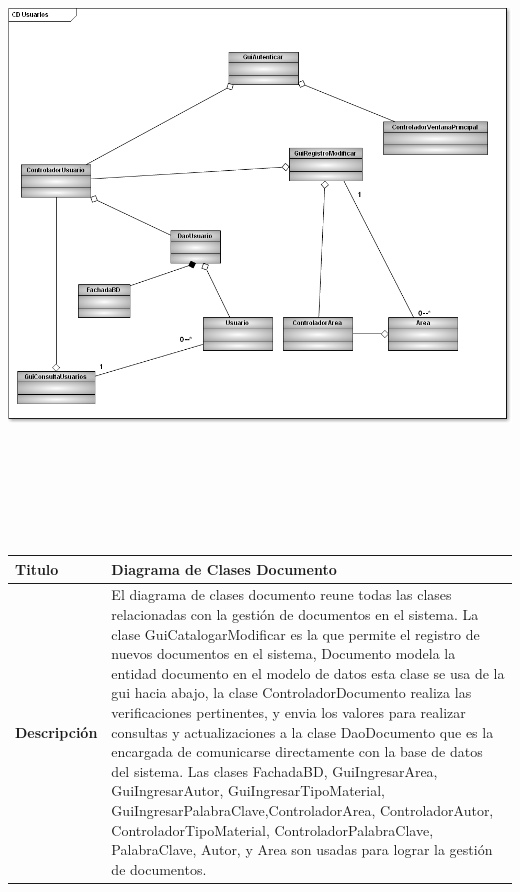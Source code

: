 	\begin{minipage}[c]{1\linewidth}
	\centering
	\includegraphics[width=20cm, height=17cm, angle=90]{diagramasClase/DiagramaClases1}
	\end{minipage}
			
		
	

				
	\begin{tabular}{|p{5cm}|p{11cm}|}\hline
	{\bf Titulo} & {Diagrama de Clases Documento}\\
	\hline
	{\bf Descripción} & {El diagrama de clases documento reune todas las clases
	relacionadas con la gestión de documentos en el sistema.\newline
	La clase GuiCatalogarModificar es la que permite el registro de nuevos documentos
	en el sistema, Documento modela la entidad documento en el modelo de datos esta clase
	se usa de la gui hacia abajo, la clase ControladorDocumento realiza las verificaciones 
	pertinentes, y envia los valores para realizar consultas y actualizaciones a la clase 
	DaoDocumento que es la encargada de comunicarse directamente con la base de datos del
	sistema.\newline
	Las clases FachadaBD, GuiIngresarArea, GuiIngresarAutor, GuiIngresarTipoMaterial,
	GuiIngresarPalabraClave,ControladorArea, ControladorAutor, ControladorTipoMaterial,
	ControladorPalabraClave, PalabraClave, Autor, y Area son usadas para lograr la gestión de
	documentos.}\\
	\hline
	\end{tabular}\\[.5cm]
	
